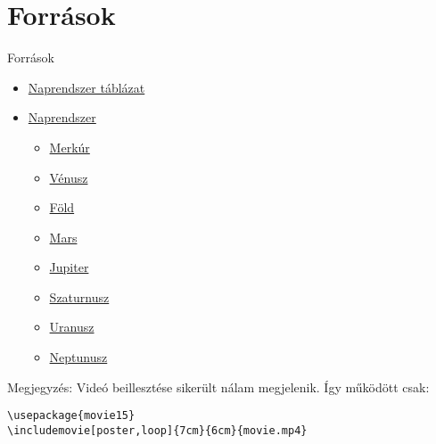 \documentclass[aspectratio=169,12pt,xcolor={table},compress]{beamer}
\begin{document}
\section{Források}
\frame{\tableofcontents[currentsection]}
\begin{frame}[fragile]{Források}
\begin{itemize}
\item \href{http://gyurokaroly.programozo-oktatas.hu}{Naprendszer táblázat}
\item \href{https://www.csillagaszat.hu/tudastar/a-naprendszer-felepitese-kialakulasa/03-a-naprendszer-keletkezese/}{Naprendszer}
\begin{itemize}
\item \href{http://astro.u-szeged.hu/oktatas/csillagaszat/6_Naprendszer/010301Merkur/merkur.html}{Merkúr}
\item \href{http://astro.u-szeged.hu/oktatas/csillagaszat/6_Naprendszer/010302Venusz/venusz.html}{Vénusz}
\item \href{http://astro.u-szeged.hu/oktatas/csillagaszat/6_Naprendszer/01030301Fold/fold.html}{Föld}
\item \href{http://astro.u-szeged.hu/oktatas/csillagaszat/6_Naprendszer/010304Mars/Mars.html}{Mars}
\item \href{http://astro.u-szeged.hu/oktatas/csillagaszat/6_Naprendszer/010305Jupiter/Jupiter.html}{Jupiter}
\item \href{http://astro.u-szeged.hu/oktatas/csillagaszat/6_Naprendszer/010306Szaturnusz/Szaturnusz.html}{Szaturnusz}
\item \href{http://astro.u-szeged.hu/oktatas/csillagaszat/6_Naprendszer/010307Uranusz/Uranusz.html}{Uranusz}
\item \href{http://astro.u-szeged.hu/oktatas/csillagaszat/6_Naprendszer/010308Neptunusz/Neptunusz.html}{Neptunusz}
\end{itemize}
\end{itemize}
Megjegyzés:
Videó beillesztése sikerült nálam megjelenik. Így működött csak:
\begin{lstlisting}
\usepackage{movie15}
\includemovie[poster,loop]{7cm}{6cm}{movie.mp4}
\end{lstlisting}
\end{frame}
\end{document}
